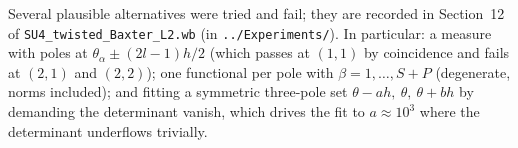 \documentclass[11pt]{article}
\begin{document}
Several plausible alternatives were tried and fail; they are recorded in Section~12 of
\texttt{SU4\_twisted\_Baxter\_L2.wb} (in \texttt{../Experiments/}). In particular: a measure with
poles at $\theta_\alpha \pm (2l-1)h/2$ (which passes at $(1,1)$ by coincidence and fails at
$(2,1)$ and $(2,2)$); one functional per pole with $\beta = 1,\dots,S+P$ (degenerate, norms
included); and fitting a symmetric three-pole set $\theta-a h,\ \theta,\ \theta+b h$ by demanding
the determinant vanish, which drives the fit to $a \approx 10^3$ where the determinant underflows
trivially.
\end{document}
